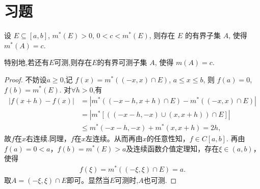 \documentclass[../../main.tex]{subfiles}%
\begin{document}
\section{习题}

\begin{proposition}\label{proposition:Lebesgue外测度的内介值性}
设 \(E \subseteq [a,b]\), \(m^*(E)>0\), \(0 < c < m^*(E)\), 则存在 \(E\) 的有界子集 \(A\), 使得 \(m^*(A)=c\).

特别地,若还有$E$可测,则存在\(E\)的有界可测子集 \(A\), 使得 \(m(A)=c\).
\end{proposition}
\begin{proof}
不妨设$a\geqslant 0$,记 \(f(x)=m^*((-x,x) \cap E)\), \(a \leqslant  x \leqslant  b\), 则 \(f(a)=0\), \(f(b)=m^*(E)\). 对$\forall h>0$,有
\begin{align*}
\left| f\left( x+h \right) -f\left( x \right) \right|&=\left| m^*\left( \left( -x-h,x+h \right) \cap E \right) -m^*\left( \left( -x,x \right) \cap E \right) \right|\\
&=\left| m^*\left[ \left( \left( -x-h,-x \right) \cup \left( x,x+h \right) \right) \cap E \right] \right|\\
&\leqslant m^*\left( -x-h,-x \right) +m^*\left( x,x+h \right) =2h,
\end{align*}
故$f$在$x$右连续.同理，$f$在$x$左连续。从而再由$x$的任意性知，$f\in C\left[ a,b \right]$.
再由$f\left( a \right) =0<a$，$f\left( b \right) =m^*\left( E \right) >a$及连续函数介值定理知，存在$\xi \in \left( a,b \right)$，使得
\begin{align*}
f\left( \xi \right) =m^*\left( \left( -\xi ,\xi \right) \cap E \right) =a.
\end{align*}
取$A=\left( -\xi ,\xi \right) \cap E$即可。显然当$E$可测时,$A$也可测.
\end{proof}
\end{document}
